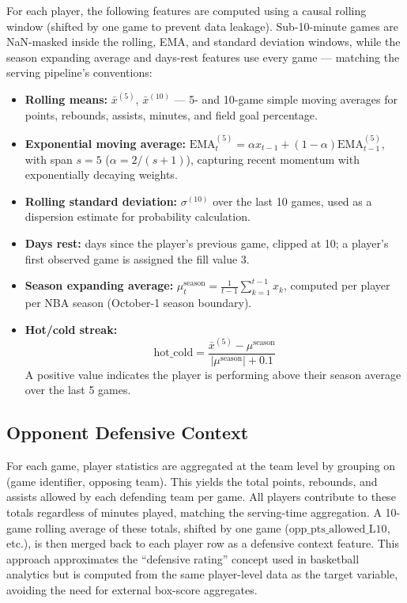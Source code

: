 \documentclass[12pt, letterpaper]{article}
\begin{document}
For each player, the following features are computed using a causal rolling
window (shifted by one game to prevent data leakage).
Sub-10-minute games are NaN-masked inside the rolling, EMA, and standard
deviation windows, while the season expanding average and days-rest
features use every game --- matching the serving pipeline's conventions:

\begin{itemize}
    \item \textbf{Rolling means:} $\bar{x}^{(5)}$, $\bar{x}^{(10)}$ ---
          5- and 10-game simple moving averages for points, rebounds,
          assists, minutes, and field goal percentage.
    \item \textbf{Exponential moving average:}
          $\text{EMA}^{(5)}_t = \alpha x_{t-1} + (1-\alpha)\text{EMA}^{(5)}_{t-1}$,
          with span $s=5$ ($\alpha = 2/(s+1)$), capturing recent momentum
          with exponentially decaying weights.
    \item \textbf{Rolling standard deviation:} $\sigma^{(10)}$ over the
          last 10 games, used as a dispersion estimate for probability
          calculation.
    \item \textbf{Days rest:} days since the player's previous game,
          clipped at 10; a player's first observed game is assigned the
          fill value 3.
    \item \textbf{Season expanding average:} $\mu^{\text{season}}_t =
          \frac{1}{t-1}\sum_{k=1}^{t-1} x_k$, computed per player per
          NBA season (October-1 season boundary).
    \item \textbf{Hot/cold streak:}
          \begin{equation}
              \text{hot\_cold} = \frac{\bar{x}^{(5)} - \mu^{\text{season}}}
              {|\mu^{\text{season}}| + 0.1}
              \label{eq:hotcold}
          \end{equation}
          A positive value indicates the player is performing above their
          season average over the last 5 games.
\end{itemize}

\subsection{Opponent Defensive Context}

For each game, player statistics are aggregated at the team level by
grouping on (game identifier, opposing team). This yields the total points,
rebounds, and assists allowed by each defending team per game.
All players contribute to these totals regardless of minutes played,
matching the serving-time aggregation.
A 10-game rolling average of these totals, shifted by one game
($\text{opp\_pts\_allowed\_L10}$, etc.), is then merged back to each
player row as a defensive context feature.
This approach approximates the ``defensive rating'' concept used in
basketball analytics but is computed from the same player-level data
as the target variable, avoiding the need for external box-score aggregates.
\end{document}
